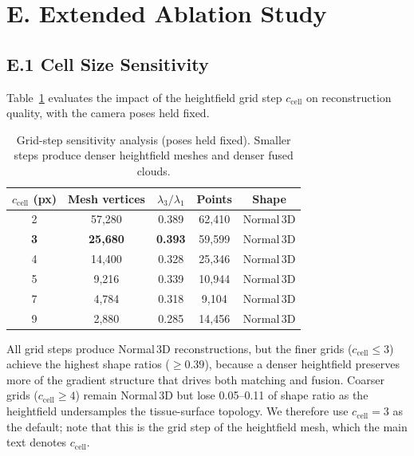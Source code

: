 \documentclass[review]{elsarticle}
\begin{document}
\section*{E. Extended Ablation Study}

\subsection*{E.1 Cell Size Sensitivity}

Table~\ref{tab:supp_cell_size} evaluates the impact of the heightfield grid step $c_{\mathrm{cell}}$ on reconstruction quality, with the camera poses held fixed.

\begin{table}[h]
\centering
\caption{Grid-step sensitivity analysis (poses held fixed). Smaller steps produce denser heightfield meshes and denser fused clouds.}
\label{tab:supp_cell_size}
\setlength{\tabcolsep}{4pt}
\renewcommand{\arraystretch}{1.05}
\begin{tabular}{ccccc}
\toprule
$c_{\mathrm{cell}}$ (px) & Mesh vertices & $\lambda_3/\lambda_1$ & Points & Shape \\
\midrule
2 & 57{,}280 & 0.389 & 62{,}410 & Normal\,3D \\
\textbf{3} & \textbf{25{,}680} & \textbf{0.393} & 59{,}599 & Normal\,3D \\
4 & 14{,}400 & 0.328 & 25{,}346 & Normal\,3D \\
5 & 9{,}216 & 0.339 & 10{,}944 & Normal\,3D \\
7 & 4{,}784 & 0.318 & 9{,}104 & Normal\,3D \\
9 & 2{,}880 & 0.285 & 14{,}456 & Normal\,3D \\
\bottomrule
\end{tabular}
\end{table}

All grid steps produce Normal\,3D reconstructions, but the finer grids ($c_{\mathrm{cell}} \leq 3$) achieve the highest shape ratios ($\geq 0.39$), because a denser heightfield preserves more of the gradient structure that drives both matching and fusion.
Coarser grids ($c_{\mathrm{cell}} \geq 4$) remain Normal\,3D but lose 0.05--0.11 of shape ratio as the heightfield undersamples the tissue-surface topology.
We therefore use $c_{\mathrm{cell}}{=}3$ as the default; note that this is the grid step of the heightfield mesh, which the main text denotes $c_{\mathrm{cell}}$.
\end{document}
